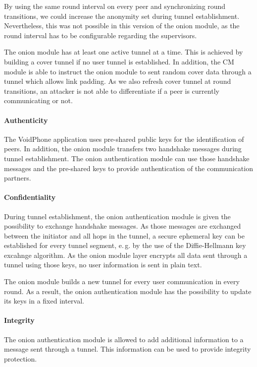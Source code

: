 \documentclass[paper=letter, fontsize=12pt]{article}
\begin{document}
By using the same round interval on every peer and synchronizing round transitions, we could increase the anonymity set during tunnel establishment.
Nevertheless, this was not possible in this version of the onion module, as the round interval has to be configurable regarding the supervisors.

The onion module has at least one active tunnel at a time.
This is achieved by building a cover tunnel if no user tunnel is established.
In addition, the CM module is able to instruct the onion module to sent random cover data through a tunnel which allows link padding.
As we also refresh cover tunnel at round transitions, an attacker is not able to differentiate if a peer is currently communicating or not.


\paragraph{Authenticity}
The VoidPhone application uses pre-shared public keys for the identification of peers.
In addition, the onion module transfers two handshake messages during tunnel establishment.
The onion authentication module can use those handshake messages and the pre-shared keys to provide authentication of the communication partners.

\paragraph{Confidentiality}
During tunnel establishment, the onion authentication module is given the possibility to exchange handshake messages.
As those messages are exchanged between the initiator and all hops in the tunnel, a secure ephemeral key can be established for every tunnel segment, e.\,g. by the use of the Diffie-Hellmann key excahnge algorithm.
As the onion module layer encrypts all data sent through a tunnel using those keys, no user information is sent in plain text.

The onion module builds a new tunnel for every user communication in every round.
As a result, the onion authentication module has the possibility to update its keys in a fixed interval.

\paragraph{Integrity}
The onion authentication module is allowed to add additional information to a message sent through a tunnel.
This information can be used to provide integrity protection.
\end{document}
